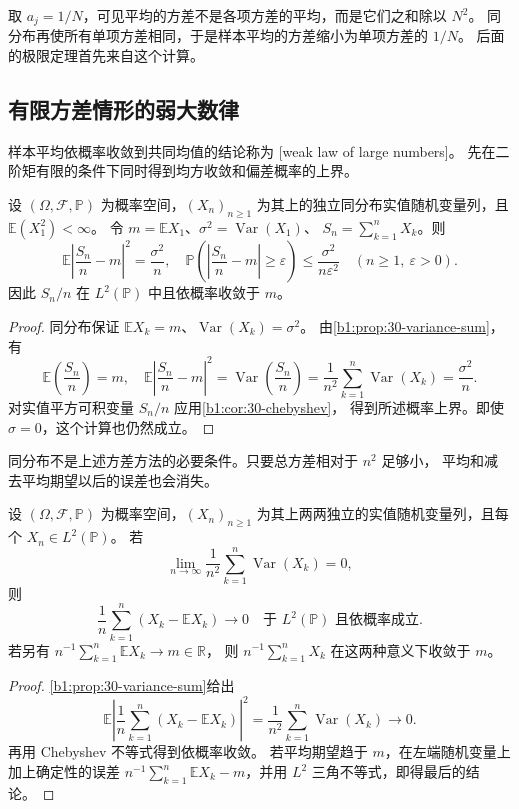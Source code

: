 取 \(a_j=1/N\)，可见平均的方差不是各项方差的平均，而是它们之和除以 \(N^2\)。
同分布再使所有单项方差相同，于是样本平均的方差缩小为单项方差的 \(1/N\)。
后面的极限定理首先来自这个计算。

\subsection{有限方差情形的弱大数律}
\label{b1:subsec:300402}

样本平均依概率收敛到共同均值的结论称为
[weak law of large numbers]。
先在二阶矩有限的条件下同时得到均方收敛和偏差概率的上界。

\begin{theorem}[有限方差的弱大数定律]
\label{b1:thm:30-finite-variance-weak-law}
设 \((\Omega,\mathcal F,\mathbb P)\) 为概率空间，\((X_n)_{n\geq1}\)
为其上的独立同分布实值随机变量列，且 \(\mathbb E(X_1^2)<\infty\)。
令 \(m=\mathbb E X_1\)、\(\sigma^2=\operatorname{Var}(X_1)\)、
\(S_n=\sum_{k=1}^nX_k\)。则
\[
 \mathbb E\left|\frac{S_n}{n}-m\right|^2=\frac{\sigma^2}{n},
 \quad
 \mathbb P\left(\left|\frac{S_n}{n}-m\right|\geq\varepsilon\right)
 \leq\frac{\sigma^2}{n\varepsilon^2}
 \quad(n\geq1,\ \varepsilon>0).
\]
因此 \(S_n/n\) 在 \(L^2(\mathbb P)\) 中且依概率收敛于 \(m\)。
\end{theorem}
\begin{proof}
同分布保证 \(\mathbb E X_k=m\)、\(\operatorname{Var}(X_k)=\sigma^2\)。
由\cref{b1:prop:30-variance-sum}，有
\[
 \mathbb E\left(\frac{S_n}{n}\right)=m,
 \quad
 \mathbb E\left|\frac{S_n}{n}-m\right|^2
 =\operatorname{Var}\left(\frac{S_n}{n}\right)
 =\frac1{n^2}\sum_{k=1}^n\operatorname{Var}(X_k)
 =\frac{\sigma^2}{n}.
\]
对实值平方可积变量 \(S_n/n\) 应用\cref{b1:cor:30-chebyshev}，
得到所述概率上界。即使 \(\sigma=0\)，这个计算也仍然成立。
\end{proof}

同分布不是上述方差方法的必要条件。只要总方差相对于 \(n^2\) 足够小，
平均和减去平均期望以后的误差也会消失。

\begin{corollary}[非同分布变量的方差条件]
\label{b1:cor:30-variance-weak-law}
设 \((\Omega,\mathcal F,\mathbb P)\) 为概率空间，\((X_n)_{n\geq1}\)
为其上两两独立的实值随机变量列，且每个 \(X_n\in L^2(\mathbb P)\)。
若
\[
 \lim_{n\to\infty}\frac1{n^2}
       \sum_{k=1}^n\operatorname{Var}(X_k)=0,
\]
则
\[
 \frac1n\sum_{k=1}^n(X_k-\mathbb E X_k)\longrightarrow0
 \quad\text{于 }L^2(\mathbb P)\text{ 且依概率成立}.
\]
若另有 \(n^{-1}\sum_{k=1}^n\mathbb E X_k\to m\in\mathbb R\)，
则 \(n^{-1}\sum_{k=1}^nX_k\) 在这两种意义下收敛于 \(m\)。
\end{corollary}
\begin{proof}
\cref{b1:prop:30-variance-sum}给出
\[
 \mathbb E\left|\frac1n\sum_{k=1}^n(X_k-\mathbb E X_k)\right|^2
 =\frac1{n^2}\sum_{k=1}^n\operatorname{Var}(X_k)\longrightarrow0.
\]
再用 Chebyshev 不等式得到依概率收敛。
若平均期望趋于 \(m\)，在左端随机变量上加上确定性的误差
\(n^{-1}\sum_{k=1}^n\mathbb E X_k-m\)，并用 \(L^2\) 三角不等式，即得最后的结论。
\end{proof}


